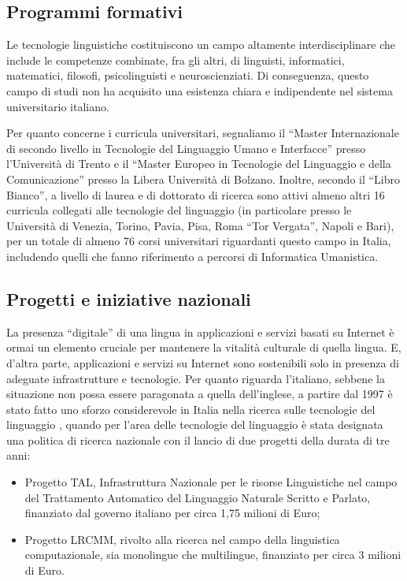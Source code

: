 \documentclass[]{../../metanetpaper}
\begin{document}
\begin{multicols}{2}
\subsection{Programmi formativi}

Le tecnologie linguistiche costituiscono un campo altamente interdisciplinare che include le competenze combinate, fra gli altri, di linguisti, informatici, matematici, filosofi, psicolinguisti e neuroscienziati. Di conseguenza, questo campo di studi non ha acquisito una esistenza chiara e indipendente nel sistema universitario italiano.

Per quanto concerne i curricula universitari, segnaliamo il “Master Internazionale di secondo livello in Tecnologie del Linguaggio Umano e Interfacce” presso l'Universit\`{a} di Trento e il “Master Europeo in Tecnologie del Linguaggio e della Comunicazione” presso la Libera Universit\`{a} di Bolzano. Inoltre, secondo il “Libro Bianco”, a livello di laurea e di dottorato di ricerca sono attivi almeno altri 16 curricula collegati alle tecnologie del linguaggio (in particolare presso le Universit\`{a} di Venezia, Torino, Pavia, Pisa, Roma “Tor Vergata”, Napoli e Bari), per un totale di almeno 76 corsi universitari riguardanti questo campo in Italia, includendo quelli che fanno riferimento a percorsi di Informatica Umanistica.




\subsection{Progetti e iniziative nazionali}

La presenza “digitale” di una lingua in applicazioni e servizi basati su Internet \`{e} ormai un elemento cruciale per mantenere la vitalit\`{a} culturale di quella lingua. E, d'altra parte, applicazioni e servizi su Internet sono sostenibili solo in presenza di adeguate infrastrutture e tecnologie. Per quanto riguarda l'italiano, sebbene la situazione non possa essere paragonata a quella dell'inglese, a partire dal 1997 \`{e} stato fatto uno sforzo considerevole in Italia nella ricerca sulle tecnologie del linguaggio , quando per l'area delle tecnologie del linguaggio \`{e} stata designata una politica di ricerca nazionale con il lancio di due progetti della durata di tre anni:


\begin{itemize}
\item Progetto TAL, Infrastruttura Nazionale per le risorse Linguistiche nel campo del Trattamento Automatico del Linguaggio Naturale Scritto e Parlato, finanziato dal governo italiano per circa 1,75 milioni di Euro;
\item Progetto LRCMM, rivolto alla ricerca nel campo della linguistica computazionale, sia monolingue che multilingue, finanziato per circa 3 milioni di Euro.
\end{itemize}



\end{multicols}
\end{document}
